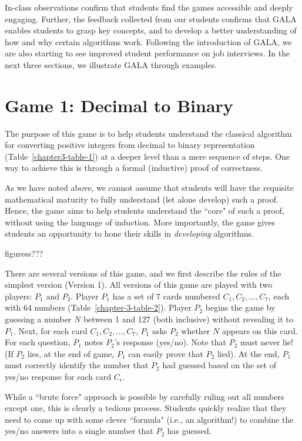 \begin{multicols}{2}
In-class observations confirm that students find the games accessible and deeply engaging. Further, the feedback collected from our students confirms that GALA enables students to grasp key concepts, and to develop a better understanding of how and why certain algorithms work. Following the introduction of GALA, we are also starting to see improved student performance on job interviews. In the next three sections, we illustrate GALA through examples.

\section{Game 1: Decimal to Binary}\label{section-3}  

The purpose of this game is to help students understand the classical algorithm for converting positive integers from decimal to binary representation (Table~\ref{chapter3-table-1})  at a deeper level than a mere sequence of steps. One way to achieve this is through a formal (inductive) proof of correctness.
  
As we have noted above, we cannot assume that students will have the requisite mathematical maturity to fully understand (let alone develop) such a proof. Hence, the game aims to help students understand the ``core" of such a proof, without using the language of induction. More importantly, the game gives students an opportunity to hone their skills in \textit{developing} algorithms. 

figuress???
 
There are several versions of this game, and we first describe the rules of the simplest version (Version 1). All versions of this game are played with two players: $P_{1}$ and $P_{2}$. Player $P_{1}$ has a set of 7 cards numbered $C_{1}, C_{2},..., C_{7}$, each with 64 numbers (Table~\ref{chapter-3-table-2}). Player $P_{2}$ begins the game by guessing a number $N$ between 1 and 127 (both inclusive) without revealing it to $P_{1}$. Next, for each card $C_{1}, C_{2}, ..., C_{7}$, $P_{1}$ asks $P_{2}$ whether $N$ appears on this card. For each question, $P_{1}$ notes $P_{2}$'s response (yes/no). Note that $P_{2}$ must never lie! (If $P_{2}$ lies, at the end of game, $P_{1}$ can easily prove that $P_{2}$ lied). At the end, $P_{1}$ must correctly identify the number that $P_{2}$ had guessed based on the set of yes/no response for each card $C_{i}$. 
  
While a ``brute force" approach is possible by carefully ruling out all numbers except one, this is clearly a tedious process. Students quickly realize that they need to come up with some clever ``formula" (i.e., an algorithm!) to combine the yes/no answers into a single number that $P_{2}$ has guessed.  


\end{multicols}
